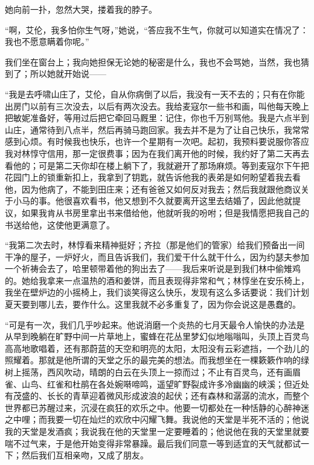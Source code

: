 \par 她向前一扑，忽然大哭，搂着我的脖子。
\par “啊，艾伦，我多怕你生气呀，”她说，“答应我不生气，你就可以知道实在情况了：我也不愿意瞒着你呢。”
\par 我们坐在窗台上；我向她担保无论她的秘密是什么，我也不会骂她，当然，我也猜到了；所以她就开始说——
\par “我是去呼啸山庄了，艾伦，自从你病倒了以后，我没有一天不去的；只有在你能出房门以前有三次没去，以后有两次没去。我给麦寇尔一些书和画，叫他每天晚上把敏妮准备好，等用过后把它牵回马厩里：记住，你也千万别骂他。我是六点半到山庄，通常待到八点半，然后再骑马跑回家。我去并不是为了让自己快乐，我常常感到心烦。有时候我也快乐，也许一个星期有一次吧。起初，我预料要说服你答应我对林惇守信用，那一定很费事；因为在我们离开他的时候，我约好了第二天再去看他的；可是第二天你却在楼上躺下了，我就避开了那场麻烦。等到麦寇尔下午把花园门上的锁重新扣上，我拿到了钥匙，就告诉他我的表弟是如何盼望着我去看他，因为他病了，不能到田庄来；还有爸爸又如何反对我去；然后我就跟他商议关于小马的事。他很喜欢看书，他又想到不久就要离开这里去结婚了，因此他就提议，如果我肯从书房里拿出书来借给他，他就听我的吩咐；但是我情愿把我自己的书送给他，这使他更满意了。
\par “我第二次去时，林惇看来精神挺好；齐拉（那是他们的管家）给我们预备出一间干净的屋子，一炉好火，而且告诉我们，我们爱干什么就干什么，因为约瑟夫参加一个祈祷会去了，哈里顿带着他的狗出去了——我后来听说是到我们林中偷雉鸡的。她给我拿来一点温热的酒和姜饼，而且表现得非常和气；林惇坐在安乐椅上，我坐在壁炉边的小摇椅上，我们谈笑得这么快乐，发现有这么多话要说：我们计划夏天要到哪儿去，要作什么。这里我就不必多重复了，因为你会说这是愚蠢的。
\par “可是有一次，我们几乎吵起来。他说消磨一个炎热的七月天最令人愉快的办法是从早到晚躺在旷野中间一片草地上，蜜蜂在花丛里梦幻似地嗡嗡叫，头顶上百灵鸟高高地歌唱着，还有那蔚蓝的天空和明亮的太阳，太阳没有云彩遮挡，一个劲儿的照耀着。那就是他所谓的天堂之乐的最完美的想法。而我想坐在一棵簌簌作响的绿树上摇荡，西风吹动，晴朗的白云在头顶上一掠而过；不止有百灵鸟，还有画眉雀、山鸟、红雀和杜鹃在各处婉啭啼鸣，遥望旷野裂成许多冷幽幽的峡溪；但近处有茂盛的、长长的青草迎着微风形成波浪的起伏；还有森林和潺潺的流水，而整个世界都已苏醒过来，沉浸在疯狂的欢乐之中。他要一切都处在一种恬静的心醉神迷之中哩；而我要一切在灿烂的欢欣中闪耀飞舞。我说他的天堂是半死不活的；他说我的天堂是发酒疯；我说我在他的天堂里一定要睡着的；他说他在我的天堂里就要喘不过气来，于是他开始变得非常暴躁。最后我们同意一等到适宜的天气就都试一下；然后我们互相亲吻，又成了朋友。
